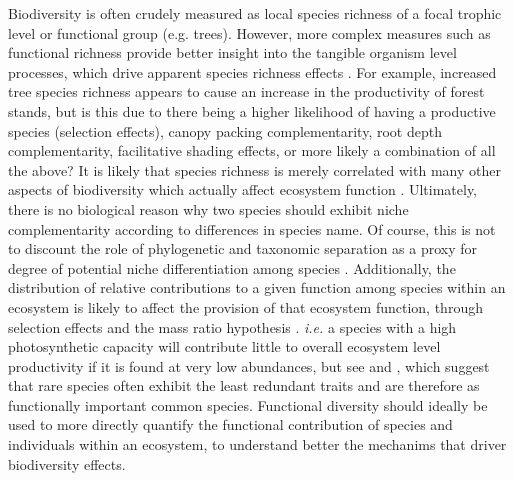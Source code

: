 \begin{refsection}
Biodiversity is often crudely measured as local species richness of a focal trophic level or functional group (e.g. trees). However, more complex measures such as functional richness provide better insight into the tangible organism level processes, which drive apparent species richness effects \citep{Finegan2015, Scherer-Lorenzen2014, Petchey2006}. For example, increased tree species richness appears to cause an increase in the productivity of forest stands, but is this due to there being a higher likelihood of having a productive species (selection effects), canopy packing complementarity, root depth complementarity, facilitative shading effects, or more likely a combination of all the above? It is likely that species richness is merely correlated with many other aspects of biodiversity which actually affect ecosystem function \citep{Mlambo2014, Scherer-Lorenzen2014}. Ultimately, there is no biological reason why two species should exhibit niche complementarity according to differences in species name. Of course, this is not to discount the role of phylogenetic and taxonomic separation as a proxy for degree of potential niche differentiation among species \citep{Flynn2011, Petchey2002}. Additionally, the distribution of relative contributions to a given function among species within an ecosystem is likely to affect the provision of that ecosystem function, through selection effects and the mass ratio hypothesis \citep{Chisholm2013b}. \textit{i.e.} a species with a high photosynthetic capacity will contribute little to overall ecosystem level productivity if it is found at very low abundances, but see \citet{Violle2017} and \citet{Soliveres2016}, which suggest that rare species often exhibit the least redundant traits and are therefore as functionally important common species. Functional diversity should ideally be used to more directly quantify the functional contribution of species and individuals within an ecosystem, to understand better the mechanims that driver biodiversity effects.


\end{refsection}
